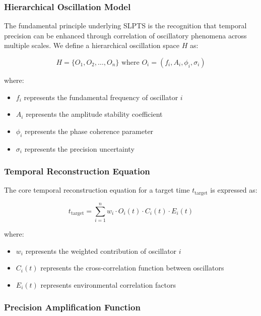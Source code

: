 \documentclass[12pt,a4paper]{article}
\begin{document}
{\subsubsection{Hierarchical Oscillation Model}

The fundamental principle underlying SLPTS is the recognition that temporal precision can be enhanced through correlation of oscillatory phenomena across multiple scales. We define a hierarchical oscillation space $H$ as:

\begin{equation}
H = \{O_1, O_2, \ldots, O_n\} \text{ where } O_i = (f_i, A_i, \phi_i, \sigma_i)
\end{equation}

where:
\begin{itemize}
\item $f_i$ represents the fundamental frequency of oscillator $i$
\item $A_i$ represents the amplitude stability coefficient
\item $\phi_i$ represents the phase coherence parameter
\item $\sigma_i$ represents the precision uncertainty
\end{itemize}

\subsubsection{Temporal Reconstruction Equation}

The core temporal reconstruction equation for a target time $t_{\text{target}}$ is expressed as:

\begin{equation}
t_{\text{target}} = \sum_{i=1}^{n} w_i \cdot O_i(t) \cdot C_i(t) \cdot E_i(t)
\end{equation}

where:
\begin{itemize}
\item $w_i$ represents the weighted contribution of oscillator $i$
\item $C_i(t)$ represents the cross-correlation function between oscillators
\item $E_i(t)$ represents environmental correlation factors
\end{itemize}

\subsubsection{Precision Amplification Function}

}
\end{document}
